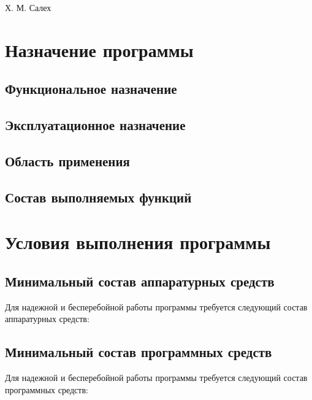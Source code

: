 \documentclass[a4paper,12pt,reqno]{article}
\begin{document}
	
	
	
	

	{Х. М. Салех}
	
	\firstPage
						\newpage
	\secondPage
						\newpage
	\thirdPage
						\newpage
						
	\section{Назначение программы}
	\subsection{Функциональное назначение}
	
	\subsection{Эксплуатационное назначение}
	
	\subsection{Область применения}
	
	\subsection{Состав выполняемых функций}
	
	
	\newpage
	\section{Условия выполнения программы}
	\subsection{Минимальный состав аппаратурных средств}
	Для надежной и бесперебойной работы программы требуется следующий состав аппаратурных средств:
	
	
	\subsection{Минимальный состав программных средств}
	Для надежной и бесперебойной работы программы требуется следующий состав программных средств:
	
	
\end{document}
